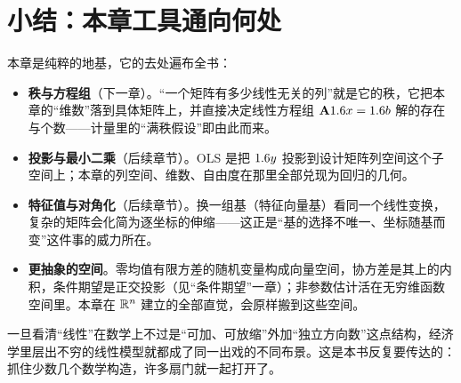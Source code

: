 \section{小结：本章工具通向何处}
\label{sec:vec-8}


本章是纯粹的地基，它的去处遍布全书：

\begin{itemize}
    \item \textbf{秩与方程组}（下一章）。``一个矩阵有多少线性无关的列''就是它的秩，它把本章的``维数''落到具体矩阵上，并直接决定线性方程组 $\mathbf{A}1.6 x=1.6 b$ 解的存在与个数——计量里的``满秩假设''即由此而来。
    \item \textbf{投影与最小二乘}（后续章节）。OLS 是把 $1.6 y$ 投影到设计矩阵列空间这个子空间上；本章的列空间、维数、自由度在那里全部兑现为回归的几何。
    \item \textbf{特征值与对角化}（后续章节）。换一组基（特征向量基）看同一个线性变换，复杂的矩阵会化简为逐坐标的伸缩——这正是``基的选择不唯一、坐标随基而变''这件事的威力所在。
    \item \textbf{更抽象的空间}。零均值有限方差的随机变量构成向量空间，协方差是其上的内积，条件期望是正交投影（见``条件期望''一章）；非参数估计活在无穷维函数空间里。本章在 $\mathbb{R}^n$ 建立的全部直觉，会原样搬到这些空间。
\end{itemize}

一旦看清``线性''在数学上不过是``可加、可放缩''外加``独立方向数''这点结构，经济学里层出不穷的线性模型就都成了同一出戏的不同布景。这是本书反复要传达的：抓住少数几个数学构造，许多扇门就一起打开了。
